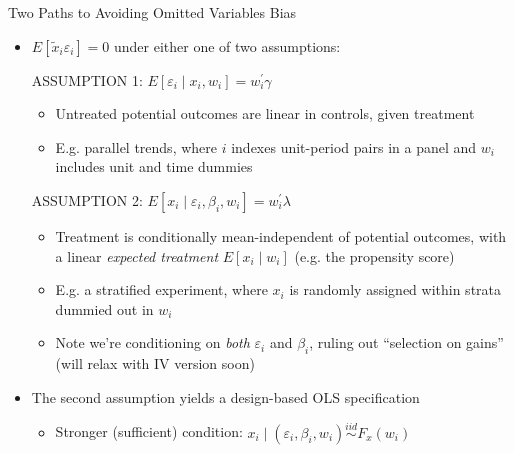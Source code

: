 \documentclass[11pt,english]{beamer}
\begin{document}
\begin{frame}{Two Paths to Avoiding Omitted Variables Bias}

\begin{itemize}
\item $E[\tilde{x}_i\varepsilon_i]=0$ under either one of two assumptions:
\bigskip\pause{}

ASSUMPTION 1: $E[\varepsilon_i\mid x_i,w_i]=w_i^\prime\gamma$
\smallskip
\begin{itemize}
\item Untreated potential outcomes are linear in controls, given treatment\smallskip
\item E.g. parallel trends, where $i$ indexes unit-period pairs in a panel and $w_i$ includes unit and time dummies
\end{itemize}
\bigskip\pause{}

ASSUMPTION 2: $E[x_i\mid \varepsilon_i,\beta_i,w_i]=w_i^\prime\lambda$
\smallskip
\begin{itemize}
\item Treatment is conditionally mean-independent
of potential outcomes, with a linear \emph{expected
treatment} $E[x_i\mid w_i]$ (e.g. the propensity score)\smallskip
\item E.g. a stratified experiment, where $x_i$ is randomly assigned within strata dummied out in $w_i$ \smallskip
\item Note we're conditioning on \emph{both} $\varepsilon_i$ and $\beta_i$, ruling out ``selection on gains'' (will relax with IV version soon)
\end{itemize}
\bigskip\pause{}

\item The second assumption yields a design-based OLS specification\smallskip
\begin{itemize}
\item Stronger (sufficient) condition: $x_i\mid (\varepsilon_i,\beta_i,w_i)\stackrel{iid}{\sim} F_x(w_i)$
\end{itemize}
\end{itemize}

\end{frame}
\end{document}
